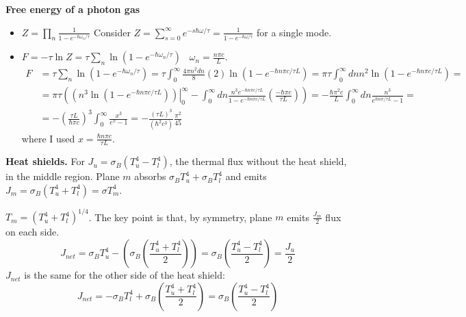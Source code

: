  \textbf{ Free energy of a photon gas}
\begin{itemize}
\item[(a)] $Z = \prod_n \frac{1}{1- e^{-\hbar \omega_n /\tau} }$  Consider $Z = \sum_{s=0}^{\infty} e^{-s\hbar \omega/\tau} = \frac{1}{ 1 -e^{-\hbar \omega/\tau}}$ for a single mode.  
\item[(b)] $F = -\tau \ln{Z} = \tau \sum_n \ln{ (1 - e^{-\hbar \omega_n/\tau} )}$ \quad \, $\omega_n = \frac{ n \pi c}{L}$.  
\[
\begin{aligned}
  F & = \tau \sum_n \ln{ ( 1 - e^{-\hbar \omega_n/\tau} )} = \tau \int_0^{\infty} \frac{ 4\pi n^2 dn }{8} (2) \ln{ (1 - e^{-\hbar n \pi c/\tau L} )} = \pi \tau \int_0^{\infty} dn n^2 \ln{ (1 - e^{-\hbar n \pi c/\tau L})} = \\
  & = \pi \tau \left( \left. (n^3 \ln{ (1-e^{-\hbar n \pi c/\tau L} ) })\right|_0^{\infty} - \int_0^{\infty} dn \frac{n^3 e^{-\hbar n \pi c/\tau L} }{ 1 - e^{-\hbar n \pi c/\tau L} } \left( \frac{ - \hbar \pi c}{\tau L} \right) \right) = - \frac{ \hbar \pi^2 c }{L} \int_0^{\infty} dn \frac{n^3}{e^{\hbar n \pi /\tau L} -1 } =\\ 
  & =  - \left( \frac{ \tau L}{ \hbar \pi c} \right)^3 \int_0^{\infty} \frac{x^3}{e^x- 1}   = -\frac{(\tau L)^3}{ (\hbar^2 c^3)} \frac{\pi^2}{45}
\end{aligned}
\]
where I used $x = \frac{ \hbar n \pi c}{\tau L}$.  
\end{itemize}



 \textbf{Heat shields.} For $J_u = \sigma_B(T_u^4 - T_l^4)$, the thermal flux without the heat shield, in the middle region.  Plane $m$ absorbs $\sigma_B T_u^4 + \sigma_B T_l^4$ and emits $J_m = \sigma_B (T_u^4 + T_l^4) = \sigma T_m^4$.  

$T_m = (T_u^4 + T_l^4)^{1/4}$.  The key point is that, by symmetry, plane $m$ emits $\frac{J_m}{2}$ flux on each side.  
\[
J_{net} = \sigma_B T_u^4 - ( \sigma_B \left( \frac{T_u^4 + T_l^4}{2} \right) ) = \sigma_B \left( \frac{T_u^4 - T_l^4}{ 2} \right) = \frac{J_u}{2} 
\]
$J_{net}$ is the same for the other side of the heat shield:
\[
J_{net} = -\sigma_B T_l^4 + \sigma_B \left( \frac{T_u^4 + T_l^4}{2} \right) = \sigma_B \left( \frac{ T_u^4 - T_l^4 }{2} \right)
\]





